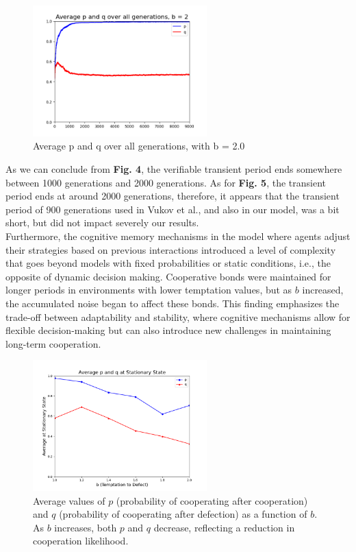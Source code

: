\documentclass[runningheads]{llncs}
\begin{document}
\begin{figure}[H]
    \centering
    \includegraphics[width=0.6\textwidth]{avg_p_q_b-2.0.png}
    \caption{Average p and q over all generations, with b = 2.0}
    \label{fig:avg_p_q_b-2.0}
\end{figure}
As we can conclude from \textbf{Fig. 4}, the verifiable transient period ends
somewhere between 1000 generations and 2000 generations. As for \textbf{Fig. 5},
the transient period ends at around 2000 generations, therefore, it appears that
the transient period of 900 generations used in Vukov et al., and
also in our model, was a bit short, but did not impact severely our results.\\
Furthermore, the cognitive memory mechanisms in the model where agents
adjust their strategies based on
previous interactions introduced a level of complexity that goes beyond models with
fixed probabilities or static conditions, i.e., the opposite of dynamic decision making.
Cooperative bonds were maintained for longer periods in environments with lower
temptation values, but as \( b \) increased, the accumulated noise began to affect
these bonds. This finding emphasizes the trade-off between adaptability and stability,
where cognitive mechanisms allow for flexible decision-making but can also
introduce new challenges in maintaining long-term cooperation.

\begin{figure}[H]
    \centering
    \includegraphics[width=0.6\textwidth]{p_q_vs_b.png}
    \caption{Average values of \( p \) (probability of cooperating after cooperation)
    and \( q \) (probability of cooperating after defection) as a function of \( b \).
    As \( b \) increases, both \( p \) and \( q \) decrease, reflecting a
    reduction in cooperation likelihood.}
    \label{fig:p_q_vs_b}
\end{figure}
\end{document}
